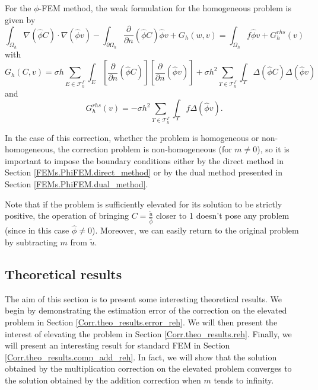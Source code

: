 For the $\phi$-FEM method, the weak formulation for the homogeneous problem is given by
\begin{equation*}
	\int_{\Omega_h} \nabla (\hat{\phi} C) \cdot \nabla (\hat{\phi} v) - \int_{\partial\Omega_h} \frac{\partial}{\partial n}(\hat{\phi} C)\hat{\phi} v+G_h(w,v)=\int_{\Omega_h} f \hat{\phi} v + G_h^{rhs}(v)
\end{equation*}
with
\begin{equation*}
	G_h(C,v)=\sigma h\sum_{E\in\mathcal{F}_h^\Gamma} \int_E \left[\frac{\partial}{\partial n}(\hat{\phi} C)\right] \left[\frac{\partial}{\partial n}(\hat{\phi} v)\right]+\sigma h^2\sum_{T\in\mathcal{T}_h^\Gamma} \int_{T} \Delta(\hat{\phi} C)\Delta(\hat{\phi} v)
\end{equation*}
and
\begin{equation*}
	G_h^{rhs}(v)=-\sigma h^2\sum_{T\in\mathcal{T}_h^\Gamma} \int_{T} f \Delta(\hat{\phi} v).
\end{equation*}

In the case of this correction, whether the problem is homogeneous or non-homogeneous, the correction problem is non-homogeneous (for $m\ne 0$), so it is important to impose the boundary conditions either by the direct method in Section \ref{FEMs.PhiFEM.direct_method} or by the dual method presented in Section \ref{FEMs.PhiFEM.dual_method}.

\begin{Rem}
	Note that if the problem is sufficiently elevated for its solution to be strictly positive, the operation of bringing $C=\frac{\tilde{u}}{\hat{\phi}}$ closer to 1 doesn't pose any problem (since in this case $\hat{\phi}\ne 0$). Moreover, we can easily return to the original problem by subtracting $m$ from $\tilde{u}$.
\end{Rem}

\subsection{Theoretical results} \label{Corr.theo_results}

The aim of this section is to present some interesting theoretical results. We begin by demonstrating the estimation error of the correction on the elevated problem in Section \ref{Corr.theo_results.error_reh}. We will then present the interest of elevating the problem in Section \ref{Corr.theo_results.reh}. Finally, we will present an interesting result for standard FEM in Section \ref{Corr.theo_results.comp_add_reh}. In fact, we will show that the solution obtained by the multiplication correction on the elevated problem converges to the solution obtained by the addition correction when $m$ tends to infinity.

